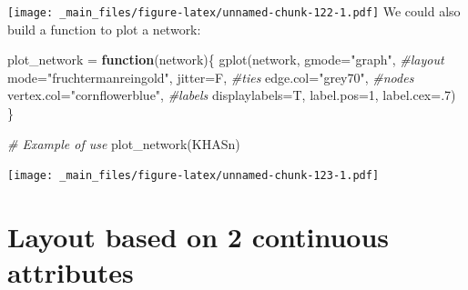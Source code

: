 \documentclass[
  notitlepage,
  onecolumn,
  openany]{book}
\newenvironment{Shaded}{\begin{snugshade}}{\end{snugshade}}
\newcommand{\AttributeTok}[1]{\textcolor[rgb]{0.77,0.63,0.00}{#1}}
\newcommand{\CommentTok}[1]{\textcolor[rgb]{0.56,0.35,0.01}{\textit{#1}}}
\newcommand{\ControlFlowTok}[1]{\textcolor[rgb]{0.13,0.29,0.53}{\textbf{#1}}}
\newcommand{\DecValTok}[1]{\textcolor[rgb]{0.00,0.00,0.81}{#1}}
\newcommand{\FunctionTok}[1]{\textcolor[rgb]{0.00,0.00,0.00}{#1}}
\newcommand{\NormalTok}[1]{#1}
\newcommand{\OtherTok}[1]{\textcolor[rgb]{0.56,0.35,0.01}{#1}}
\newcommand{\StringTok}[1]{\textcolor[rgb]{0.31,0.60,0.02}{#1}}
\begin{document}
\texttt{[image: \_main\_files/figure-latex/unnamed-chunk-122-1.pdf]}
We could also build a function to plot a network:

\begin{Shaded}
\begin{Highlighting}[]
\NormalTok{plot\_network }\OtherTok{=} \ControlFlowTok{function}\NormalTok{(network)\{}
    \FunctionTok{gplot}\NormalTok{(network, }
      \AttributeTok{gmode=}\StringTok{"graph"}\NormalTok{,}
      \CommentTok{\#layout}
      \AttributeTok{mode=}\StringTok{"fruchtermanreingold"}\NormalTok{,}
      \AttributeTok{jitter=}\NormalTok{F,}
      \CommentTok{\#ties}
      \AttributeTok{edge.col=}\StringTok{"grey70"}\NormalTok{,}
      \CommentTok{\#nodes}
      \AttributeTok{vertex.col=}\StringTok{"cornflowerblue"}\NormalTok{,}
      \CommentTok{\#labels}
      \AttributeTok{displaylabels=}\NormalTok{T,}
      \AttributeTok{label.pos=}\DecValTok{1}\NormalTok{,}
      \AttributeTok{label.cex=}\NormalTok{.}\DecValTok{7}\NormalTok{)}
\NormalTok{\}}

\CommentTok{\# Example of use}
\FunctionTok{plot\_network}\NormalTok{(KHASn)}
\end{Highlighting}
\end{Shaded}

\texttt{[image: \_main\_files/figure-latex/unnamed-chunk-123-1.pdf]}

\hypertarget{layout-based-on-2-continuous-attributes}{%
\section{Layout based on 2 continuous attributes}\label{layout-based-on-2-continuous-attributes}}
\end{document}
